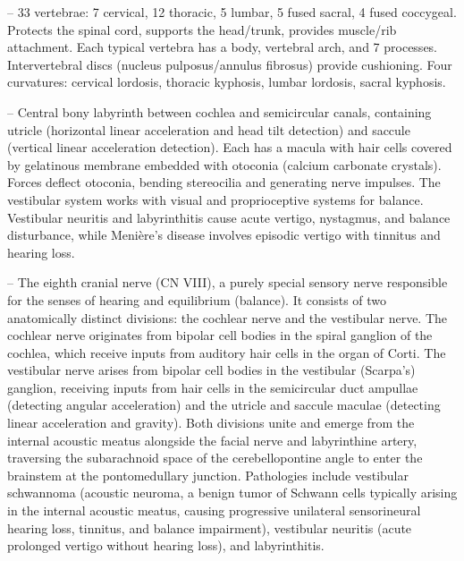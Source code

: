 -- 33 vertebrae: 7 cervical, 12 thoracic, 5 lumbar, 5 fused sacral, 4 fused coccygeal. Protects the spinal cord, supports the head/trunk, provides muscle/rib attachment. Each typical vertebra has a body, vertebral arch, and 7 processes. Intervertebral discs (nucleus pulposus/annulus fibrosus) provide cushioning. Four curvatures: cervical lordosis, thoracic kyphosis, lumbar lordosis, sacral kyphosis.

-- Central bony labyrinth between cochlea and semicircular canals, containing utricle (horizontal linear acceleration and head tilt detection) and saccule (vertical linear acceleration detection). Each has a macula with hair cells covered by gelatinous membrane embedded with otoconia (calcium carbonate crystals). Forces deflect otoconia, bending stereocilia and generating nerve impulses. The vestibular system works with visual and proprioceptive systems for balance. Vestibular neuritis and labyrinthitis cause acute vertigo, nystagmus, and balance disturbance, while Menière's disease involves episodic vertigo with tinnitus and hearing loss.

-- The eighth cranial nerve (CN VIII), a purely special sensory nerve responsible for the senses of hearing and equilibrium (balance). It consists of two anatomically distinct divisions: the cochlear nerve and the vestibular nerve. The cochlear nerve originates from bipolar cell bodies in the spiral ganglion of the cochlea, which receive inputs from auditory hair cells in the organ of Corti. The vestibular nerve arises from bipolar cell bodies in the vestibular (Scarpa's) ganglion, receiving inputs from hair cells in the semicircular duct ampullae (detecting angular acceleration) and the utricle and saccule maculae (detecting linear acceleration and gravity). Both divisions unite and emerge from the internal acoustic meatus alongside the facial nerve and labyrinthine artery, traversing the subarachnoid space of the cerebellopontine angle to enter the brainstem at the pontomedullary junction. Pathologies include vestibular schwannoma (acoustic neuroma, a benign tumor of Schwann cells typically arising in the internal acoustic meatus, causing progressive unilateral sensorineural hearing loss, tinnitus, and balance impairment), vestibular neuritis (acute prolonged vertigo without hearing loss), and labyrinthitis.

